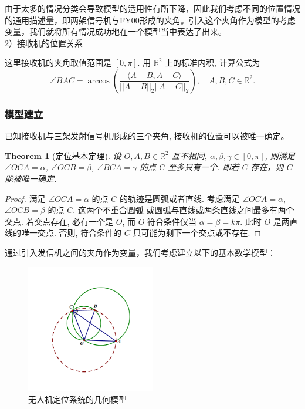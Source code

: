 \documentclass{my_paper}
\newcommand{\R}{\mathbb{R}}
\newtheorem{theorem}{Theorem}
\begin{document}
由于太多的情况分类会导致模型的适用性有所下降，因此我们考虑不同的位置情况的通用描述量，即两架信号机与FY00形成的夹角。引入这个夹角作为模型的考虑变量，我们就将所有情况成功地在一个模型当中表达了出来。\\

2）接收机的位置关系

这里接收机的夹角取值范围是 $[0,\pi]$. 用 $\R^2$ 上的标准内积, 计算公式为
$$
    \angle BAC = \arccos (\frac{\langle A-B,A-C\rangle}{||A-B||_2||A-C||_2}),\quad A,B,C\in \R^2.
$$


\subsubsection{模型建立}

已知接收机与三架发射信号机形成的三个夹角, 接收机的位置可以被唯一确定。
\begin{theorem}[定位基本定理]
    设 $O,A,B\in\R^2$ 互不相同, $\alpha,\beta,\gamma\in[0,\pi]$, 则满足 $\angle OCA = \alpha$, $\angle OCB = \beta$, $\angle BCA = \gamma$ 的点 $C$ 
    至多只有一个. 即若 $C$ 存在，则 $C$ 能被唯一确定. 
\end{theorem}
\begin{proof}
    满足 $\angle OCA = \alpha$ 的点 $C$ 的轨迹是圆弧或者直线. 考虑满足 $\angle OCA = \alpha$, $\angle OCB = \beta$ 的点 $C$. 这两个不重合圆弧
    或圆弧与直线或两条直线之间最多有两个交点. 若交点存在, 必有一个是 $O$, 而 $O$ 符合条件仅当 $\alpha=\beta=k\pi$. 
    此时 $O$ 是两直线的唯一交点. 否则, 符合条件的 $C$ 只可能为剩下一个交点或不存在. 
\end{proof}

通过引入发信机之间的夹角作为变量，我们考虑建立以下的基本数学模型：

\begin{figure}[H]
    \centering
    \includegraphics[width=0.5\textwidth]{sketch2}
    \caption{无人机定位系统的几何模型} 
\end{figure}
\end{document}
